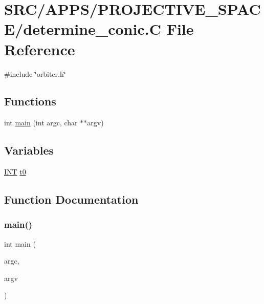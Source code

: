 \hypertarget{determine__conic_8_c}{}\section{S\+R\+C/\+A\+P\+P\+S/\+P\+R\+O\+J\+E\+C\+T\+I\+V\+E\+\_\+\+S\+P\+A\+C\+E/determine\+\_\+conic.C File Reference}
\label{determine__conic_8_c}
{\ttfamily \#include \char`\"{}orbiter.\+h\char`\"{}}\newline
\subsection*{Functions}
\begin{DoxyCompactItemize}
\item 
int \mbox{\hyperlink{determine__conic_8_c_a3c04138a5bfe5d72780bb7e82a18e627}{main}} (int argc, char $\ast$$\ast$argv)
\end{DoxyCompactItemize}
\subsection*{Variables}
\begin{DoxyCompactItemize}
\item 
\mbox{\hyperlink{galois_8h_a09fddde158a3a20bd2dcadb609de11dc}{I\+NT}} \mbox{\hyperlink{determine__conic_8_c_a4268f4fe222ffb119218a0199f5e1904}{t0}}
\end{DoxyCompactItemize}


\subsection{Function Documentation}
\mbox{\label{determine__conic_8_c_a3c04138a5bfe5d72780bb7e82a18e627}} 
\subsubsection{\texorpdfstring{main()}{main()}}
{\footnotesize\ttfamily int main (\begin{DoxyParamCaption}\item[{int}]{argc,  }\item[{char $\ast$$\ast$}]{argv }\end{DoxyParamCaption})}




